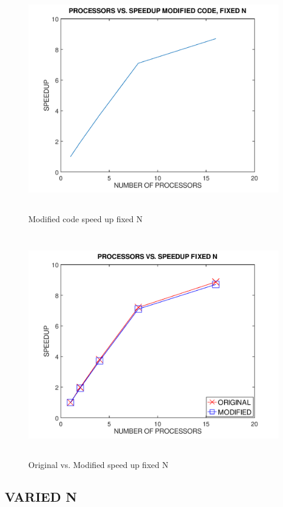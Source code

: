 \documentclass[12pt]{article}
\begin{document}
	\begin{figure}[H]
		\hfill\includegraphics[width=150mm,height= 100mm]{fix_mod.png}\hspace*{\fill}
		\caption{Modified code speed up fixed N }
	\end{figure}


	\begin{figure}[H]
		\hfill\includegraphics[width=150mm,height= 100mm]{fix_combine.png}\hspace*{\fill}
		\caption{Original vs. Modified speed up fixed N }
	\end{figure}

	\newpage
	\subsection{VARIED N}
	\noindent
\end{document}
